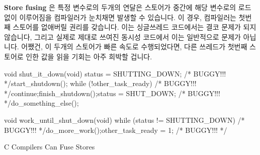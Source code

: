 {\bf Store fusing} 은 특정 변수로의 두개의 연달은 스토어가 중간에 해당 변수로의
로드 없이 이루어짐을 컴파일러가 눈치채면 발생할 수 있습니다.
이 경우, 컴파일러는 첫번째 스토어를 없애버릴 권리를 갖습니다.
이는 싱글쓰레드 코드에서는 결코 문제가 되지 않습니다, 그리고 실제로 제대로
쓰여진 동시성 코드에서 이는 일반적으로 문제가 아닙니다.
어쨌건, 이 두개의 스토어가 빠른 속도로 수행되었다면, 다른 쓰레드가 첫번째
스토어로 인한 값을 읽을 기회는 아주 희박할 겁니다.

\begin{listing}[tbp]
\begin{fcvlabel}
\begin{VerbatimL}[commandchars=\\\[\]]
void shut_it_down(void)
{
	status = SHUTTING_DOWN; /* BUGGY!!! */\lnlbl[store:a]
	start_shutdown();
	while (!other_task_ready) /* BUGGY!!! */\lnlbl[loop:b]
		continue;\lnlbl[loop:e]
	finish_shutdown();\lnlbl[finish]
	status = SHUT_DOWN; /* BUGGY!!! */\lnlbl[store:b]
	do_something_else();
}

void work_until_shut_down(void)
{
	while (status != SHUTTING_DOWN) /* BUGGY!!! */
		do_more_work();
	other_task_ready = 1; /* BUGGY!!! */
}
\end{VerbatimL}
\end{fcvlabel}
\caption{C Compilers Can Fuse Stores}
\label{lst:toolsoftrade:C Compilers Can Fuse Stores}
\end{listing}

